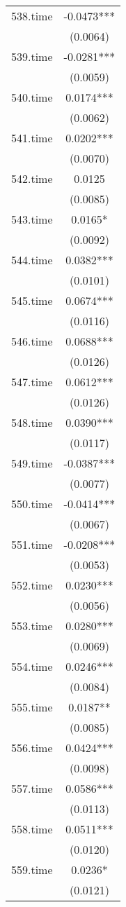 \documentclass[]{article}
\begin{document}
\begin{tabular}{lc}
538.time & -0.0473*** \\
 & (0.0064) \\
539.time & -0.0281*** \\
 & (0.0059) \\
540.time & 0.0174*** \\
 & (0.0062) \\
541.time & 0.0202*** \\
 & (0.0070) \\
542.time & 0.0125 \\
 & (0.0085) \\
543.time & 0.0165* \\
 & (0.0092) \\
544.time & 0.0382*** \\
 & (0.0101) \\
545.time & 0.0674*** \\
 & (0.0116) \\
546.time & 0.0688*** \\
 & (0.0126) \\
547.time & 0.0612*** \\
 & (0.0126) \\
548.time & 0.0390*** \\
 & (0.0117) \\
549.time & -0.0387*** \\
 & (0.0077) \\
550.time & -0.0414*** \\
 & (0.0067) \\
551.time & -0.0208*** \\
 & (0.0053) \\
552.time & 0.0230*** \\
 & (0.0056) \\
553.time & 0.0280*** \\
 & (0.0069) \\
554.time & 0.0246*** \\
 & (0.0084) \\
555.time & 0.0187** \\
 & (0.0085) \\
556.time & 0.0424*** \\
 & (0.0098) \\
557.time & 0.0586*** \\
 & (0.0113) \\
558.time & 0.0511*** \\
 & (0.0120) \\
559.time & 0.0236* \\
 & (0.0121) \\

\end{tabular}
\end{document}
